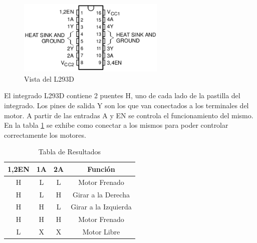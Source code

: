 \documentclass[a4paper,10pt]{article}
\begin{document}
					\begin{figure}[!htb]
						\centering
						\includegraphics[width=7cm]{Imagenes/puenteH.jpg}
						\caption{Vista del L293D} \label{timg003}
					\end{figure}

					El integrado L293D contiene 2 puentes H, uno de cada lado de la pastilla del integrado. Los pines de salida Y son los que van conectados a 
					los terminales del motor. A partir de las entradas A y EN se controla el funcionamiento del mismo. En la tabla \ref{tab001} se exhibe como 
					conectar a los mismos para poder controlar correctamente los motores.
				
					\begin{table}[!htp]
						\centering
						\begin{tabular}{|c|c|c|c|}
							\hline
							1,2EN & 1A & 2A & Función \\
							\hline
							H & L & L & Motor Frenado \\
							\hline 
							H & L	& H & Girar a la Derecha \\
							\hline
							H & H & L & Girar a la Izquierda \\
							\hline
							H & H & H &  Motor Frenado \\
							\hline
							L & X & X & Motor Libre \\	
							\hline
						\end{tabular}
					\caption{Tabla de Resultados} \label{tab001}
					\end{table}
\end{document}
